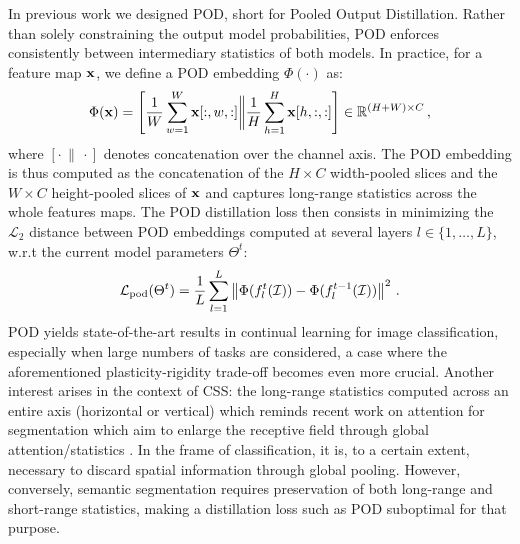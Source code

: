 In previous work \cite{douillard2020podnet} we designed POD, short for Pooled Output Distillation.
Rather than solely constraining the output model probabilities, POD enforces consistently between
intermediary statistics of both models. In practice, for a feature map $\mathbf{x}$, we define a POD
embedding $\Phi(\cdot)$ as:
%
\begin{equation}
    \Phi(\mathbf{x}) = \left[\frac{1}{W} \sum_{w=1}^W \mathbf{x}[:,w,:] \bigg\Vert \frac{1}{H} \sum_{h=1}^H \mathbf{x}[h,:,:]\right] \in \mathbb{R}^{(H + W) \times C}\,,
    \label{eq:seg_pod_embedding}
\end{equation}
%
where $[\cdot\,\|\,\cdot]$ denotes concatenation over the channel axis. The POD embedding is thus
computed as the concatenation of the $H \times C$ width-pooled slices and the $W \times C$
height-pooled slices of $\mathbf{x}$ and captures long-range statistics across the whole features maps. The
POD distillation loss then consists in minimizing the $\mathcal{L}_2$ distance between POD
embeddings computed at several layers $l \in \{1, \dots, L\}$, w.r.t the current model parameters
$\Theta^t$:
%
\begin{equation}
    \mathcal{L}_\text{pod}(\Theta^t) = \frac{1}{L} \sum_{l = 1}^L \left\Vert  \Phi(f^t_l(\mathcal{I})) -  \Phi(f^{t-1}_l(\mathcal{I})) \right\Vert^2\,.
    \label{eq:seg_pod_loss}
\end{equation}
%
POD yields state-of-the-art results in continual learning for image classification, especially when
large numbers of tasks are considered, a case where the aforementioned plasticity-rigidity trade-off
becomes even more crucial. Another interest arises in the context of \ac{CSS}: the long-range statistics
computed across an entire axis (horizontal or vertical) which reminds recent work on attention for
segmentation \cite{wang2020axialdeeplab,huang2020ccnet,park2020csc} which aim to enlarge the
receptive field through global attention/statistics \cite{wang2020axialdeeplab}. In the frame of
classification, it is, to a certain extent, necessary to discard spatial information through global
pooling. However, conversely, semantic segmentation requires preservation of both long-range and
short-range statistics, making a distillation loss such as POD suboptimal for that purpose.


